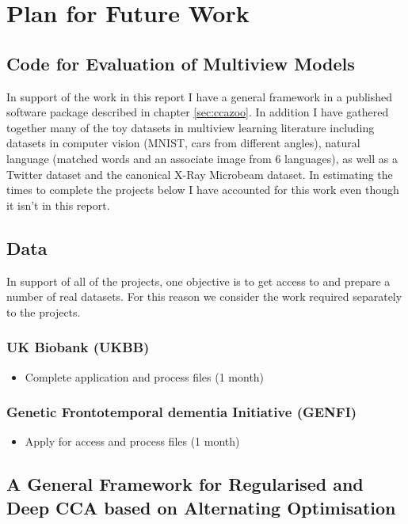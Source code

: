\chapter{Plan for Future Work}\label{chap:futureplan}

\section{Code for Evaluation of Multiview Models}
In support of the work in this report I have a general framework in a published software package described in chapter \ref{sec:ccazoo}. In addition I have gathered together many of the toy datasets in multiview learning literature including datasets in computer vision (MNIST, cars from different angles), natural language (matched words and an associate image from 6 languages), as well as a Twitter dataset and the canonical X-Ray Microbeam dataset. In estimating the times to complete the projects below I have accounted for this work even though it isn't in this report.

\section{Data}
In support of all of the projects, one objective is to get access to and prepare a number of real datasets. For this reason we consider the work required separately to the projects.

\subsection{UK Biobank (UKBB)}

\begin{itemize}
    \item Complete application and process files (1 month)
\end{itemize}

\subsection{Genetic Frontotemporal dementia Initiative (GENFI)}

\begin{itemize}
    \item Apply for access and process files (1 month)
\end{itemize}

\section{A General Framework for Regularised and Deep CCA based on Alternating Optimisation}
